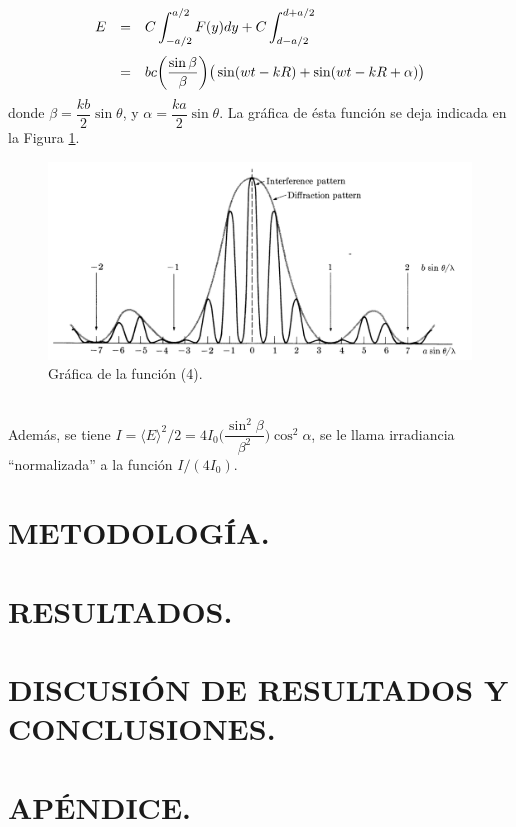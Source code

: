\documentclass[12pt,a4paper]{article}
\begin{document}
\begin{equation}
	\begin{array}{rcl}
		E & = & C \displaystyle\int _{-a/2} ^{a/2} F(y) dy + C \displaystyle\int _{d-a/2} ^{d+a/2}  \\[5mm]
		& = & bc \bigg(\dfrac{\sin \beta}{\beta}\bigg) \big(\sin (wt-kR) + \sin (wt-kR + \alpha)\big)
	\end{array}
	\label{eq:campo_electrico}
\end{equation}
donde \(\beta = \dfrac{kb}{2} \sin \theta\), y \(\alpha = \dfrac{ka}{2} \sin \theta\). La gráfica de ésta función se deja indicada en la Figura \ref{fig:grafica}. 
\begin{figure}[hbt!]
	\centering
	\includegraphics[width= 0.7 \linewidth]{1_INTRO/grafica}
	\caption{Gráfica de la función (4).}
	\label{fig:grafica}
\end{figure}\\
Además, se tiene \(I= \langle E \rangle ^2/2 = 4I_0 \bigg(\dfrac{\sin ^2 \beta}{\beta ^2}\bigg) \cos ^2\alpha \), se le llama irradiancia ``normalizada'' a la función \(I/(4I_0)\).


\section{METODOLOGÍA.} %

\section{RESULTADOS.} %

\section{DISCUSIÓN DE RESULTADOS Y CONCLUSIONES.} %




\section{APÉNDICE.} %
\end{document}

